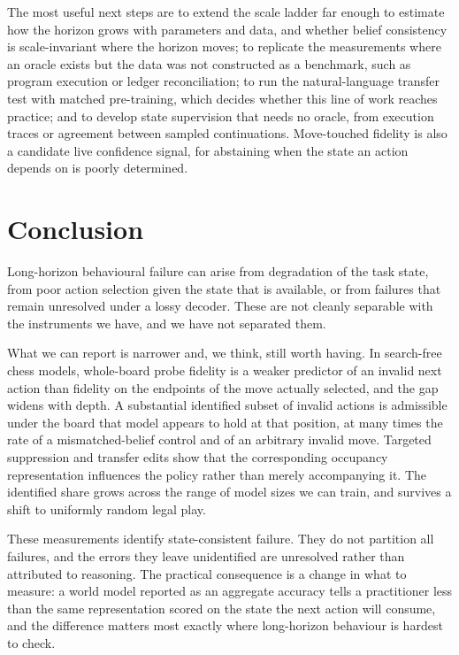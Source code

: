 \documentclass[manuscript, screen, review]{jair}
\theoremstyle{remark}
\begin{document}
The most useful next steps are to extend the scale ladder far enough to estimate
how the horizon grows with parameters and data, and whether belief consistency is
scale-invariant where the horizon moves; to replicate the measurements where an
oracle exists but the data was not constructed as a benchmark, such as program
execution or ledger reconciliation; to run the natural-language transfer test
with matched pre-training, which decides whether this line of work reaches
practice; and to develop state supervision that needs no oracle, from execution
traces or agreement between sampled continuations. Move-touched fidelity is also
a candidate live confidence signal, for abstaining when the state an action
depends on is poorly determined.

\section{Conclusion}

Long-horizon behavioural failure can arise from degradation of the task state,
from poor action selection given the state that is available, or from failures
that remain unresolved under a lossy decoder. These are not cleanly separable
with the instruments we have, and we have not separated them.

What we can report is narrower and, we think, still worth having. In search-free
chess models, whole-board probe fidelity is a weaker predictor of an invalid next
action than fidelity on the endpoints of the move actually selected, and the gap
widens with depth. A substantial identified subset of invalid actions is
admissible under the board that model appears to hold at that position, at many
times the rate of a mismatched-belief control and of an arbitrary invalid move.
Targeted suppression and transfer edits show that the corresponding occupancy
representation influences the policy rather than merely accompanying it. The
identified share grows across the range of model sizes we can train, and survives
a shift to uniformly random legal play.

These measurements identify state-consistent failure. They do not partition all
failures, and the errors they leave unidentified are unresolved rather than
attributed to reasoning. The practical consequence is a change in what to
measure: a world model reported as an aggregate accuracy tells a practitioner
less than the same representation scored on the state the next action will
consume, and the difference matters most exactly where long-horizon behaviour is
hardest to check.
\end{document}
